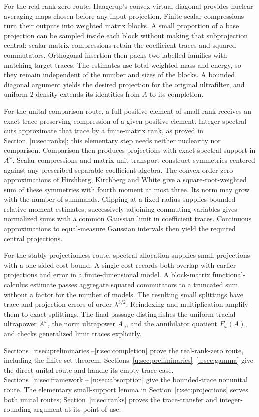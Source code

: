 For the real-rank-zero route, Haagerup's convex virtual diagonal
\cite[Theorem~3.1]{Haa83} provides nuclear averaging maps chosen before
any input projection. Finite scalar compressions turn their outputs into
weighted matrix blocks. A small proportion of a base projection can be
sampled inside each block without making that subprojection central:
scalar matrix compressions retain the coefficient traces and squared
commutators. Orthogonal insertion then packs two labelled families with matching
target traces. The estimates use total weighted mass and energy, so they remain
independent of the number and sizes of the blocks. A bounded diagonal
argument yields the desired projection for the original ultrafilter, and
uniform $2$-density extends its identities from $A$ to its completion.

For the unital comparison route, a full positive element of small rank
receives an exact trace-preserving compression of a given positive element.
Integer spectral cuts approximate that trace by a finite-matrix rank, as
proved in Section~\ref{u:sec:ranks}; this elementary step needs neither
nuclearity nor comparison. Comparison then produces projections with exact
spectral support in $A^\omega$. Scalar compressions and matrix-unit transport
construct symmetries centered against any prescribed separable coefficient
algebra. The convex order-zero approximations of Hirshberg, Kirchberg and
White \cite[Theorem~1.4]{HKW} give a square-root-weighted sum of these
symmetries with fourth moment at most three. Its norm may grow with the
number of summands. Clipping at a fixed radius supplies bounded relative
moment estimates; successively adjoining commuting variables gives normalized sums with a
common Gaussian limit in coefficient traces. Continuous approximations to
equal-measure Gaussian intervals then yield the required central projections.

For the stably projectionless route, spectral allocation supplies small
projections with a one-sided cost bound. A single cost records both overlap
with earlier projections and error in a finite-dimensional model. A
block-matrix functional-calculus estimate passes aggregate squared
commutators to a truncated sum without a factor for the number of models.
The resulting small splittings have trace and projection errors of order
$\lambda^{3/2}$. Reindexing and multiplication amplify them to exact
splittings. The final passage distinguishes the uniform tracial ultrapower
$A^\omega$, the norm ultrapower $A_\omega$, and the annihilator quotient
$F_\omega(A)$, and checks generalized limit traces explicitly.

Sections~\ref{r:sec:preliminaries}--\ref{r:sec:completion} prove the
real-rank-zero route, including the finite-set theorem.
Sections~\ref{u:sec:preliminaries}--\ref{u:sec:gamma} give the direct unital
route and handle its empty-trace case. Sections~\ref{n:sec:framework}--
\ref{n:sec:absorption} give the bounded-trace nonunital route.
The elementary small-support lemma in Section~\ref{r:sec:projections}
serves both unital routes; Section~\ref{u:sec:ranks} proves the
trace-transfer and integer-rounding argument at its point of use.

